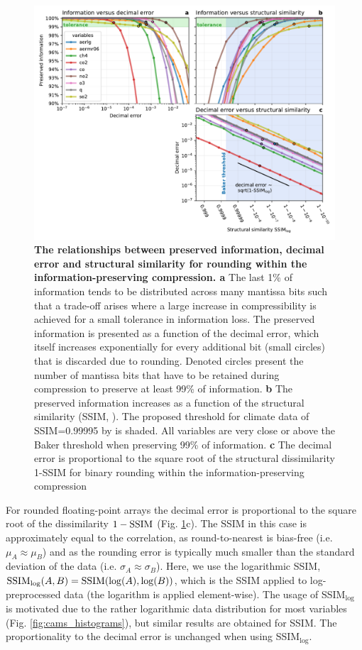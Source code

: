\begin{figure}[tbhp]
	\includegraphics[width=1\textwidth]{Figures/compression/information_error_ssim.pdf}
	\caption{\textbf{The relationships between preserved information, decimal error and structural similarity for rounding within
	the information-preserving compression. a} The last 1\% of information tends to be distributed across many mantissa bits
	such that a trade-off arises where a large increase in compressibility is achieved for a small tolerance in information loss.
	The preserved information is presented as a function of the decimal error, which itself increases exponentially for
	every additional bit (small circles) that is discarded due to rounding. Denoted circles present the number of mantissa bits
	that have to be retained during compression to preserve at least 99\% of information. \textbf{b} The preserved information
	increases as a function of the structural similarity (SSIM, \cite{Wang2004}). The proposed threshold for climate data of
	SSIM=0.99995 by \cite{Baker2019} is shaded. All variables are very close or above the Baker threshold when preserving
	99\% of information. \textbf{c} The decimal error is proportional to the square root of the structural dissimilarity 1-SSIM
	for binary rounding within the information-preserving compression}
	\label{fig:information_error_ssim}
\end{figure}

For rounded floating-point arrays the decimal error is proportional to the square root of the dissimilarity $1-\operatorname{SSIM}$
(Fig. \ref{fig:information_error_ssim}c). The SSIM in this case is approximately equal to the correlation, as round-to-nearest is
bias-free (i.e. $\mu_A \approx \mu_B$) and as the rounding error is typically much smaller than the standard deviation of the data
(i.e. $\sigma_A \approx \sigma_B$). Here, we use the logarithmic SSIM, $\operatorname{SSIM}_{\log}(A,B) = \operatorname{SSIM}(\log(A),\log(B))$,
which is the SSIM applied to log-preprocessed data (the logarithm is applied element-wise). The usage of SSIM$_{\log}$
is motivated due to the rather logarithmic data distribution for most variables (Fig. \ref{fig:cams_histograms}),
but similar results are obtained for SSIM. The proportionality to the decimal error is unchanged when using SSIM$_{\log}$.

